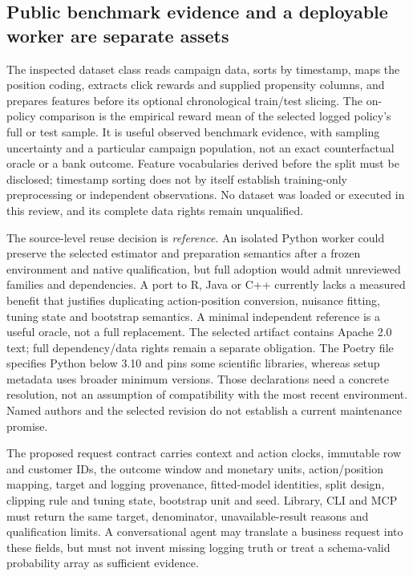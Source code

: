 \subsection{Public benchmark evidence and a deployable worker are separate assets}
\label{exec23:obp-decision}
The inspected dataset class reads campaign data, sorts by timestamp, maps the
position coding, extracts click rewards and supplied propensity columns, and
prepares features before its optional chronological train/test slicing. The
on-policy comparison is the empirical reward mean of the selected logged
policy's full or test sample. It is useful observed benchmark evidence, with
sampling uncertainty and a particular campaign population, not an exact
counterfactual oracle or a bank outcome. Feature vocabularies derived before
the split must be disclosed; timestamp sorting does not by itself establish
training-only preprocessing or independent observations. No dataset was loaded
or executed in this review, and its complete data rights remain unqualified.
\cite{exec23_obp_sources}

The source-level reuse decision is \emph{reference}. An isolated Python worker
could preserve the selected estimator and preparation semantics after a frozen
environment and native qualification, but full adoption would admit unreviewed
families and dependencies. A port to R, Java or C++ currently lacks a measured
benefit that justifies duplicating action-position conversion, nuisance fitting,
tuning state and bootstrap semantics. A minimal independent reference is a
useful oracle, not a full replacement. The selected artifact contains Apache
2.0 text; full dependency/data rights remain a separate obligation. The
Poetry file specifies Python below 3.10 and pins some scientific libraries,
whereas setup metadata uses broader minimum versions. Those declarations need
a concrete resolution, not an assumption of compatibility with the most recent
environment. Named authors and the selected revision do not establish a current
maintenance promise. \cite{exec23_obp_sources}

The proposed request contract carries context and action clocks, immutable row
and customer IDs, the outcome window and monetary units, action/position
mapping, target and logging provenance, fitted-model identities, split design,
clipping rule and tuning state, bootstrap unit and seed. Library, CLI and MCP
must return the same target, denominator, unavailable-result reasons and
qualification limits. A conversational agent may translate a business request
into these fields, but must not invent missing logging truth or treat a
schema-valid probability array as sufficient evidence.

